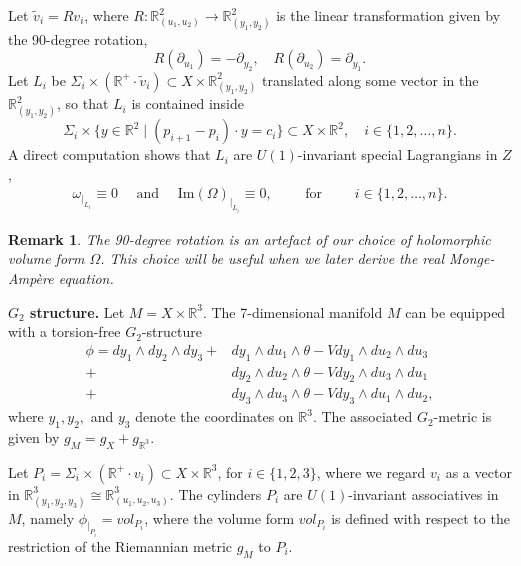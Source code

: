 \documentclass[11pt]{article}
\newtheorem{remark}{Remark}
\begin{document}
Let $\tilde{v}_i= Rv_i$, where $R: \mathbb{R}^2_{(u_1,u_2)}\to \mathbb{R}^2_{(y_1,y_2)}$ is the linear transformation given by the 90-degree rotation,
\[
R( \partial_{u_1})= -\partial_{y_2},\quad R( \partial_{u_2})= \partial_{y_1}.
\]
Let $L_{i} $ be $ \Sigma_{i} \times (\mathbb{R}^+ \cdot \tilde{v}_{i}) \subset X \times \mathbb{R}^2_{(y_1,y_2)}$ translated along some vector in the $\mathbb{R}^2_{(y_1,y_2)}$, so that $L_i$ is contained inside
\[
\Sigma_i \times \{ y \in \mathbb{R}^2 \; | \; (p_{i+1}-p_i)\cdot y=c_i \}\subset X\times \mathbb{R}^2,\quad i \in \{1,2,\ldots, n\}.
\]
A direct computation shows that $L_i$ are $U(1)$-invariant special Lagrangians in $Z$, 
\begin{align*}
\omega_{|_{L_i}} \equiv 0 \quad \text{ and } \quad 
\text{Im}(\Omega)_{|_{L_i}} \equiv 0, \quad \quad \text{ for } \quad \quad i \in \{1,2,\ldots, n\}.
\end{align*}

\begin{remark}
The 90-degree rotation is an artefact of our choice of holomorphic volume form $\Omega$. This choice will be useful when we later derive the real Monge-Amp\`ere equation. 
\end{remark}

\vspace{5pt}

\noindent
\textbf{$G_2$ structure.} Let $M = X \times \mathbb{R}^3$. The 7-dimensional manifold $M$ can be equipped with a torsion-free $G_2$-structure 
\begin{align*}
    \phi = dy_1 \wedge dy_2 \wedge dy_3 
      + & dy_1 \wedge du_1 \wedge \theta - V dy_1 \wedge du_2 \wedge du_3 \\
    +& dy_2 \wedge du_2 \wedge \theta 
    - V dy_2 \wedge du_3 \wedge du_1 \\
    +& dy_3 \wedge du_3 \wedge \theta
    - V dy_3 \wedge du_1 \wedge du_2,
\end{align*}
where $y_1, y_2, $ and $y_3$ denote the coordinates on $\mathbb{R}^3$. The associated $G_2$-metric is given by $g_M = g_X + g_{\mathbb{R}^3}$.


Let $P_{i} = \Sigma_{i} \times (\mathbb{R}^+ \cdot v_{i}) \subset X \times \mathbb{R}^3$, for $i \in \{1,2,3\}$, where we regard $v_i$ as a vector in $\mathbb{R}^3_{(y_1,y_2,y_3)} \cong \mathbb{R}^3_{(u_1,u_2,u_3)}$. The cylinders $P_i$ are $U(1)$-invariant associatives in $M$, namely $\phi_{|_{P_i}} = vol_{P_i}$, where the volume form $vol_{P_i}$ is defined with respect to the restriction of the Riemannian metric $g_M$ to $P_i$.
\end{document}
